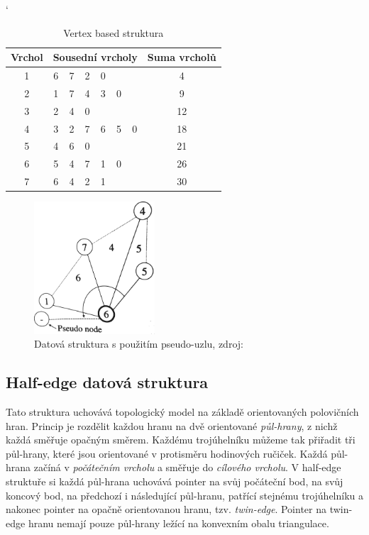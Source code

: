 \documentclass[12pt,a4paper]{article}
\begin{document}
\begin{table}[h]
\catcode`
\begin{tabular}{|c||c|c|c|c|c|c||c|}
\hline
Vrchol & \multicolumn{6}{|c|}{Sousední vrcholy} & Suma vrcholů \\ \hline \hline
1      & 6    & 7    & 2    & 0    &     &     & 4            \\ \hline
2      & 1    & 7    & 4    & 3    & 0   &     & 9            \\ \hline
3      & 2    & 4    & 0    &      &     &     & 12           \\ \hline
4      & 3    & 2    & 7    & 6    & 5   & 0   & 18           \\ \hline
5      & 4    & 6    & 0    &      &     &     & 21           \\ \hline
6      & 5    & 4    & 7    & 1    & 0   &     & 26           \\ \hline
7      & 6    & 4    & 2    & 1    &     &     & 30           \\ \hline
\end{tabular}
\caption{Vertex based struktura}
\label{tab:vertex_based}
\end{table}

\begin{figure}[h!]
\centering
\includegraphics[width=0.4\textwidth]{img/pseudo_node.png}
\caption{Datová struktura s použitím pseudo-uzlu, zdroj: \cite{triangulation}}
\label{fig:pseudo_node}
\end{figure}

\newpage
\subsection{Half-edge datová struktura}
\label{subsec:HE_struct}

Tato struktura uchovává topologický model na základě orientovaných polovičních hran. Princip je rozdělit každou hranu na dvě orientované \emph{půl-hrany}, z nichž každá směřuje opačným směrem. Každému trojúhelníku můžeme tak přiřadit tři půl-hrany, které jsou orientované v protisměru hodinových ručiček. Každá půl-hrana začíná v \emph{počátečním vrcholu} a směřuje do \emph{cílového vrcholu}. V half-edge struktuře si každá půl-hrana uchovává pointer na svůj počáteční bod, na svůj koncový bod, na předchozí i následující půl-hranu, patřící stejnému trojúhelníku a nakonec pointer na opačně orientovanou hranu, tzv. \emph{twin-edge}. Pointer na twin-edge hranu nemají pouze půl-hrany ležící na konvexním obalu triangulace.
\end{document}
